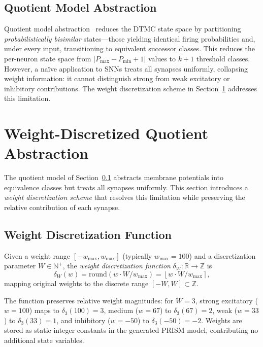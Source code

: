 \documentclass[runningheads]{llncs}
\begin{document}
\subsection{Quotient Model Abstraction}\label{sec:quotient}

Quotient model abstraction~\cite{BaierKatoen2008,Katoen2016} reduces the DTMC
state space by partitioning \emph{probabilistically bisimilar} states---those
yielding identical firing probabilities and, under every input, transitioning to
equivalent successor classes. This reduces the per-neuron state space from
$|P_{\max} - P_{\min} + 1|$ values to $k + 1$ threshold classes. However, a naïve
application to SNNs treats all synapses uniformly, collapsing weight information:
it cannot distinguish strong from weak excitatory or inhibitory contributions.
The weight discretization scheme in Section~\ref{sec:weight-disc} addresses this
limitation.


\section{Weight-Discretized Quotient Abstraction}\label{sec:weight-disc}

The quotient model of Section~\ref{sec:quotient} abstracts membrane potentials
into equivalence classes but treats all synapses uniformly. This section
introduces a \emph{weight discretization scheme} that resolves this limitation
while preserving the relative contribution of each synapse.

\subsection{Weight Discretization Function}\label{sec:disc-function}

\begin{definition}
Given a weight range $[-w_{\max}, w_{\max}]$ (typically $w_{\max} = 100$) and a
discretization parameter $W \in \mathbb{N}^{+}$, the \emph{weight discretization
function} $\delta_W : \mathbb{R} \to \mathbb{Z}$ is
\[
\delta_W(w) = \mathrm{round}\!\left(w \cdot W / w_{\max}\right)
  = \left\lfloor w \cdot W / w_{\max} \right\rceil ,
\]
mapping original weights to the discrete range $[-W, W] \subset \mathbb{Z}$.
\end{definition}

The function preserves relative weight magnitudes: for $W = 3$, strong excitatory
($w = 100$) maps to $\delta_3(100) = 3$, medium ($w = 67$) to $\delta_3(67) = 2$,
weak ($w = 33$) to $\delta_3(33) = 1$, and inhibitory ($w = -50$) to
$\delta_3(-50) = -2$. Weights are stored as static integer constants in the
generated PRISM model, contributing no additional state variables.
\end{document}
